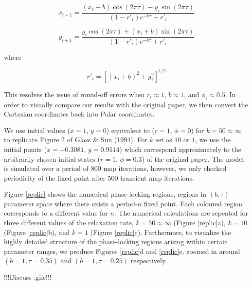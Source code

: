 \begin{equation}
    x_{i+1} = \frac{(x_i + b)\cos(2\pi\tau) - y_i \sin(2\pi\tau)}{(1 - r'_i)e^{-k\tau}+r'_i}
    \label{eqn:7}
\end{equation}

\begin{equation}
    y_{i+1} = \frac{y_i \cos(2\pi\tau) + (x_i + b) \sin(2\pi\tau)}{(1-r'_i)e^{-k\tau} + r'_i}
    \label{eqn:8}
\end{equation}

where

\begin{equation}
    r'_i = [(x_i + b)^2 + y^2_i]^{1/2} \nonumber 
\end{equation}

This resolves the issue of round-off errors when $r_i \approx 1$, $b \approx 1$, and $\phi_i \approx 0.5$. In order to visually compare our results with the original paper, we then convert the Cartesian coordinates back into Polar coordinates.

We use initial values ($x = 1$, $y = 0$) equivalent to ($r = 1$, $\phi = 0$) for $k=50\approx \infty$ to replicate Figure 2 of Glass \& Sun (1994)\supercite{GLASS1994}. For $k$ set as $10$ or $1$, we use the initial points ($x = -0.3081$, $y = 0.9514$) which correspond approximately to the arbitrarily chosen initial states ($r = 1$, $\phi = 0.3$) of the original paper. The model is simulated over a period of 800 map iterations, however, we only checked periodicity of the fixed point after 500 transient map iterations. 

Figure \ref{replic} shows the numerical phase-locking regions, regions in $(b,\tau)$ parameter space where there exists a period-$n$ fixed point. Each coloured region corresponds to a different value for $n$. The numerical calculations are repeated for three different values of the relaxation rate, $k=50\approx \infty$ (Figure \ref{replic}a), $k = 10$ (Figure \ref{replic}b), and $k = 1$ (Figure \ref{replic}c). Furthermore, to visualize the highly detailed structure of the phase-locking regions arising within certain parameter ranges, we produce Figures \ref{replic}d and \ref{replic}e, zoomed in around $(b=1,\tau=0.35)$ and $(b=1,\tau=0.25)$ respectively.

!!!Discuss .gifs!!!

